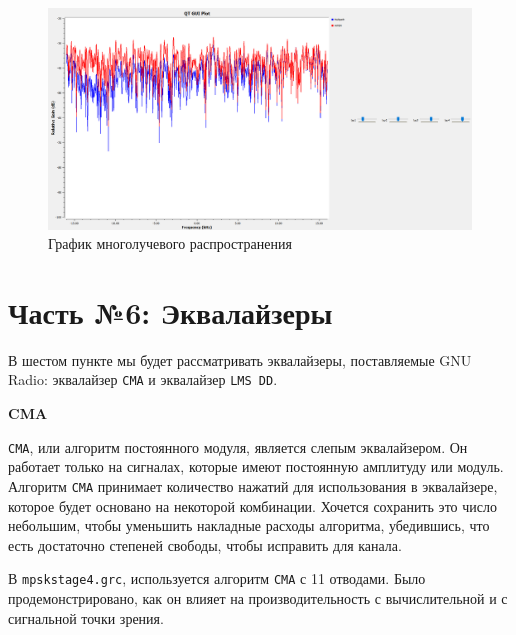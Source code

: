 \documentclass[a4paper]{article}
\begin{document}
            \begin{figure}[H]
                \centering
                \includegraphics[width=\textwidth]{img/p5_2.png}
                \caption{График многолучевого распространения}
                \label{fig:p5_2}
            \end{figure}
            
    \newpage
        \section{Часть №6: Эквалайзеры}
            В шестом пункте мы будет рассматривать эквалайзеры, поставляемые GNU Radio: эквалайзер  \texttt{CMA} и эквалайзер \texttt{LMS DD}. 
            
            \normalsize{\LARGE \textbf{CMA}}
            
             \texttt{CMA}, или алгоритм постоянного модуля, является слепым эквалайзером. Он работает только на сигналах, которые имеют постоянную амплитуду или модуль. Алгоритм  \texttt{CMA} принимает количество нажатий для использования в эквалайзере, которое будет основано на некоторой комбинации. Хочется сохранить это число небольшим, чтобы уменьшить накладные расходы алгоритма, убедившись, что есть достаточно степеней свободы, чтобы исправить для канала. 
            
            В  \texttt{mpskstage4.grc}, используется алгоритм  \texttt{CMA} с 11 отводами. Было продемонстрировано, как он влияет на производительность с вычислительной и с сигнальной точки зрения.
            
\end{document}
